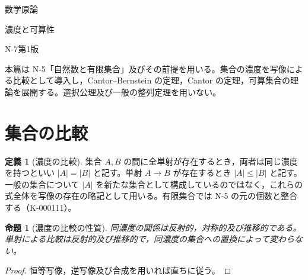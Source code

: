 \documentclass[a5paper,10pt,dvipdfmx]{jsarticle}
\theoremstyle{definition}
\newtheorem{defn}[ruledef]{定義}
\theoremstyle{plain}
\newtheorem{prop}[ruledef]{命題}
\begin{document}
\begin{center}
{\small 数学原論}\par\vspace{4mm}
{\LARGE 濃度と可算性}\par\vspace{2mm}
{\small N-7\quad 第1版}
\end{center}
本篇は N-5「自然数と有限集合」及びその前提を用いる。集合の濃度を写像による比較として導入し，Cantor--Bernstein の定理，Cantor の定理，可算集合の理論を展開する。選択公理及び一般の整列定理を用いない。
\section{集合の比較}
\begin{defn}[濃度の比較]\label{k133}
集合 $A,B$ の間に全単射が存在するとき，両者は同じ濃度を持つといい $|A|=|B|$ と記す。単射 $A\to B$ が存在するとき $|A|\leq |B|$ と記す。一般の集合について $|A|$ を新たな集合として構成しているのではなく，これらの式全体を写像の存在の略記として用いる。有限集合では N-5 の元の個数と整合する（K-000111）。
\end{defn}
\begin{prop}[濃度の比較の性質]\label{k134}
同濃度の関係は反射的，対称的及び推移的である。単射による比較は反射的及び推移的で，同濃度の集合への置換によって変わらない。
\end{prop}
\begin{proof}
恒等写像，逆写像及び合成を用いれば直ちに従う。
\end{proof}
\end{document}
